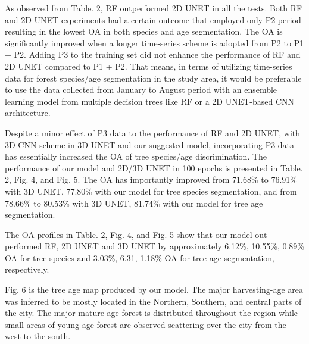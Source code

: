 As observed from Table. 2, RF outperformed 2D UNET in all the tests. Both RF and 2D UNET experiments had a certain outcome that employed only P2 period resulting in the lowest OA in both species and age segmentation. The OA is significantly improved when a longer time-series scheme is adopted from P2 to P1 + P2. Adding P3 to the training set did not enhance the performance of RF and 2D UNET compared to P1 + P2. That means, in terms of utilizing time-series data for forest species/age segmentation in the study area, it would be preferable to use the data collected from January to August period with an ensemble learning model from multiple decision trees like RF or a 2D UNET-based CNN architecture.\par

Despite a minor effect of P3 data to the performance of RF and 2D UNET, with 3D CNN scheme in 3D UNET and our suggested model, incorporating P3 data has essentially increased the OA of tree species/age discrimination. The performance of our model and 2D/3D UNET in 100 epochs is presented in Table. 2, Fig. 4, and Fig. 5. The OA has importantly improved from 71.68\% to 76.91\% with 3D UNET, 77.80\% with our model for tree species segmentation, and from 78.66\% to 80.53\% with 3D UNET, 81.74\% with our model for tree age segmentation. \par
The OA profiles in Table. 2, Fig. 4, and Fig. 5 show that our model out-performed RF, 2D UNET and 3D UNET by approximately 6.12\%, 10.55\%, 0.89\% OA for tree species and 3.03\%, 6.31, 1.18\% OA for tree age segmentation, respectively. \par
Fig. 6 is the tree age map produced by our model. The major harvesting-age area was inferred to be mostly located in the Northern, Southern, and central parts of the city. The major mature-age forest is distributed throughout the region while small areas of young-age forest are observed scattering over the city from the west to the south. \par
